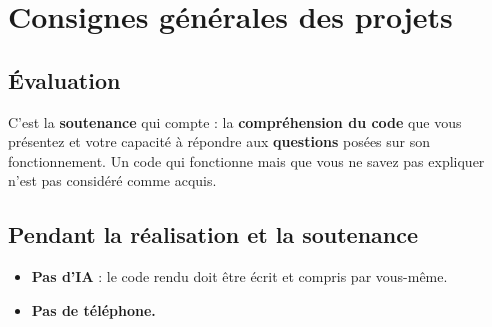 \section{Consignes générales des projets}

\subsection*{Évaluation}
C'est la \textbf{soutenance} qui compte : la \textbf{compréhension du
code} que vous présentez et votre capacité à répondre aux
\textbf{questions} posées sur son fonctionnement. Un code qui fonctionne
mais que vous ne savez pas expliquer n'est pas considéré comme acquis.

\subsection*{Pendant la réalisation et la soutenance}
\begin{itemize}
  \item \textbf{Pas d'IA} : le code rendu doit être écrit et compris par
  vous-même.
  \item \textbf{Pas de téléphone.}
\end{itemize}
